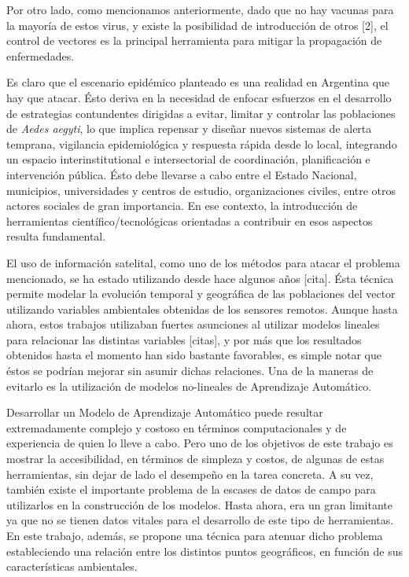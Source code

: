 \par Por otro lado, como mencionamos anteriormente, dado que no hay vacunas para la
  mayoría de estos virus, y existe la posibilidad de introducción de otros [2],
  el control de vectores es la principal herramienta para mitigar la
  propagación de enfermedades.


\par Es claro que el escenario epidémico planteado es una realidad en Argentina
  que hay que atacar. Ésto deriva en la necesidad de enfocar esfuerzos en el
  desarrollo de estrategias contundentes dirigidas a evitar, limitar y controlar
  las poblaciones de \textit{Aedes aegyti}, lo que implica repensar y diseñar
  nuevos sistemas de alerta temprana, vigilancia epidemiológica y respuesta
  rápida desde lo local, integrando un espacio interinstitutional e
  intersectorial de coordinación, planificación e intervención pública. Ésto debe
  llevarse a cabo entre el Estado Nacional, municipios, universidades y centros
  de estudio, organizaciones civiles, entre otros actores sociales de gran importancia.
  En ese contexto, la introducción de herramientas científico/tecnológicas orientadas
  a contribuir en esos aspectos resulta fundamental.

\par El uso de información satelital, como uno de los métodos para atacar el
  problema mencionado, se ha estado utilizando desde hace algunos años [cita].
  Ésta técnica permite modelar la evolución temporal y geográfica de las
  poblaciones del vector utilizando variables ambientales obtenidas de los
  sensores remotos. Aunque hasta ahora, estos trabajos utilizaban fuertes asunciones
  al utilizar modelos lineales para relacionar las distintas variables [citas], y por más
  que los resultados obtenidos hasta el momento han sido bastante
  favorables, es simple notar que éstos se podrían mejorar sin asumir dichas relaciones.
  Una de la maneras de evitarlo es la utilización de modelos no-lineales de
  Aprendizaje Automático.

\par Desarrollar un Modelo de Aprendizaje Automático puede resultar extremadamente
  complejo y costoso en términos computacionales y de experiencia de quien lo lleve
  a cabo. Pero uno de los objetivos de este trabajo es mostrar la accesibilidad,
  en términos de simpleza y costos, de algunas de estas herramientas, sin dejar
  de lado el desempeño en la tarea concreta. A su vez, también existe el importante problema
  de la escases de datos de campo para utilizarlos en la construcción de los modelos.
  Hasta ahora, era un gran limitante ya que no se tienen datos vitales
  para el desarrollo de este tipo de herramientas. En este trabajo, además, se
  propone una técnica para atenuar dicho problema estableciendo una relación
  entre los distintos puntos geográficos, en función de sus características ambientales.




